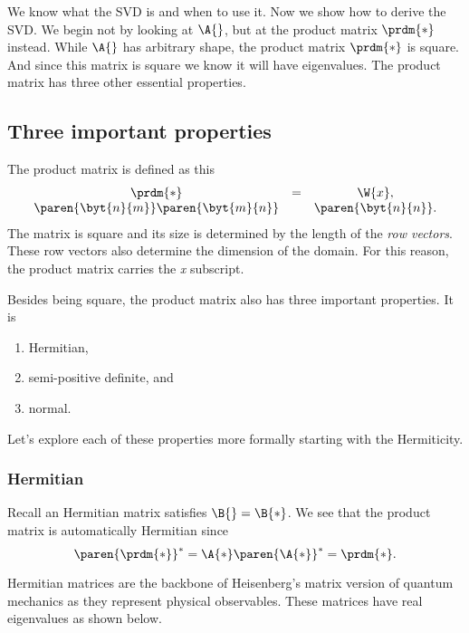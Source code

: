 We know what the SVD is and when to use it. Now we show how to derive the SVD. We begin not by looking at $\A{}$, but at the product matrix $\prdm{*}$  instead. While $\A{}$ has arbitrary shape, the product matrix  $\prdm{*}$  is square. And since this matrix is square we know it will have eigenvalues. The product matrix has three other essential properties.


\subsection{Three important properties}
The product matrix is defined as this
\begin{equation}
\begin{array}{ccc}
  \prdm{*} &=& \W{x},\\
  \paren{\byt{n}{m}}\paren{\byt{m}{n}} && \paren{\byt{n}{n}}.
\end{array}
\end{equation}
The matrix is square and its size is determined by the length of the \textit{row vectors}. These row vectors also determine the dimension of the domain. For this reason, the product matrix carries the \textit{x} subscript.

Besides being square, the product matrix also has three important properties. It is
\begin{enumerate}
  \item Hermitian,
  \item semi-positive definite, and
  \item normal.
\end{enumerate} 

Let's explore each of these properties more formally starting with the Hermiticity. 


\subsubsection{Hermitian}
Recall an Hermitian matrix satisfies $ \B{} = \B{*} $. We see that the product matrix is automatically Hermitian since
\begin{equation}
  \paren{\prdm{*}}^{*}=\A{*}\paren{\A{*}}^{*} = \prdm{*}.
\end{equation}

Hermitian matrices are the backbone of Heisenberg's matrix version of quantum mechanics as they represent physical observables. These matrices have real eigenvalues as shown below.

